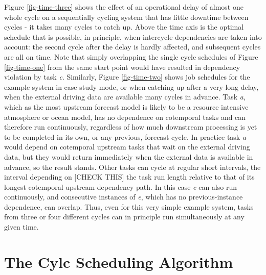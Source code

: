 \documentclass[11pt,a4paper]{article}
\begin{document}
Figure \ref{fig-time-three} shows the effect of an operational delay of
almost one whole cycle on a sequentially cycling system that has little
downtime between cycles - it takes many cycles to catch up. Above the
time axis is the optimal schedule that is possible, in principle, when
intercycle dependencies are taken into account: the second cycle after
the delay is hardly affected, and subsequent cycles are all on time.
Note that simply overlapping the single cycle schedules of Figure
\ref{fig-time-one} from the same start point would have resulted in
dependency violation by task {\em c}. Similarly, Figure
\ref{fig-time-two} shows job schedules for the example system in case
study mode, or when catching up after a very long delay, when the
external driving data are available many cycles in advance.  Task {\em
a}, which as the most upstream forecast model is likely to be a resource
intensive atmosphere or ocean model, has no dependence on cotemporal
tasks and can therefore run continuously, regardless of how much
downstream processing is yet to be completed in its own, or any
previous, forecast cycle. In practice task {\em a} would depend on
cotemporal upstream tasks that wait on the external driving data, but
they would return immediately when the external data is available in
advance, so the result stands. Other tasks can cycle at regular short
intervals, the interval depending on [CHECK THIS] the task run length
relative to that of its longest cotemporal upstream dependency path. In
this case {\em c} can also run continuously, and consecutive instances
of {\em e}, which has no previous-instance dependence, can overlap.
Thus, even for this very simple example system, tasks from three or four
different cycles can in principle run simultaneously at any given
time. 


\pagebreak
\section{The Cylc Scheduling Algorithm}
\end{document}
